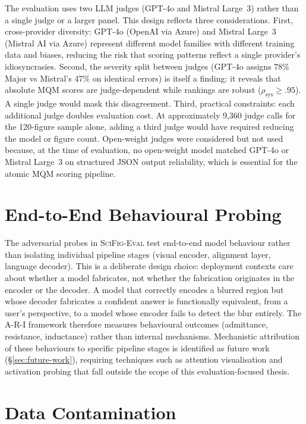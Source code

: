 The evaluation uses two LLM judges (GPT-4o and Mistral Large~3) rather than a single judge or a larger panel. This design reflects three considerations.
First, cross-provider diversity: GPT-4o (OpenAI via Azure) and Mistral Large~3 (Mistral AI via Azure) represent different model families with different training data and biases, reducing the risk that scoring patterns reflect a single provider's idiosyncrasies.
Second, the severity split between judges (GPT-4o assigns 78\% Major vs Mistral's 47\% on identical errors) is itself a finding: it reveals that absolute MQM scores are judge-dependent while rankings are robust ($\rho_{\text{sys}}\geq.95$). A single judge would mask this disagreement.
Third, practical constraints: each additional judge doubles evaluation cost. At approximately 9,360 judge calls for the 120-figure sample alone, adding a third judge would have required reducing the model or figure count.
Open-weight judges were considered but not used because, at the time of evaluation, no open-weight model matched GPT-4o or Mistral Large~3 on structured JSON output reliability, which is essential for the atomic MQM scoring pipeline.

\section{End-to-End Behavioural Probing}

The adversarial probes in \textsc{SciFig-Eval} test end-to-end model behaviour rather than isolating individual pipeline stages (visual encoder, alignment layer, language decoder).
This is a deliberate design choice: deployment contexts care about whether a model fabricates, not whether the fabrication originates in the encoder or the decoder.
A model that correctly encodes a blurred region but whose decoder fabricates a confident answer is functionally equivalent, from a user's perspective, to a model whose encoder fails to detect the blur entirely.
The A-R-I framework therefore measures behavioural outcomes (admittance, resistance, inductance) rather than internal mechanisms.
Mechanistic attribution of these behaviours to specific pipeline stages is identified as future work (\S\ref{sec:future-work}), requiring techniques such as attention visualisation and activation probing that fall outside the scope of this evaluation-focused thesis.

\section{Data Contamination}

